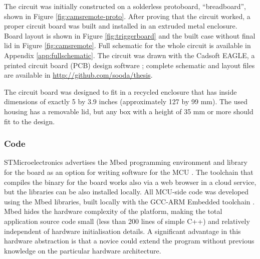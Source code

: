 The circuit was initially constructed on a solderless protoboard, ``breadboard'', shown in Figure \ref{fig:camsremote-proto}.
After proving that the circuit worked, a proper circuit board was built and installed in an extruded metal enclosure.
Board layout is shown in Figure \ref{fig:triggerboard} and the built case without final lid in Figure \ref{fig:camsremote}.
Full schematic for the whole circuit is available in Appendix \ref{app:fullschematic}.
The circuit was drawn with the Cadsoft EAGLE, a printed circuit board (PCB) design software \cite{eaglepcb}; complete schematic and layout files are available in \url {http://github.com/sooda/thesis}.

The circuit board was designed to fit in a recycled enclosure that has inside dimensions of exactly 5 by 3.9 inches (approximately 127 by 99 mm).
The used housing has a removable lid, but any box with a height of 35 mm or more should fit to the design.





\subsubsection{Code}

STMicroelectronics advertises the Mbed programming environment and library for the board as an option for writing software for the MCU \cite{mbednucleo}.
The toolchain that compiles the binary for the board works also via a web browser in a cloud service, but the libraries can be also installed locally.
All MCU-side code was developed using the Mbed libraries, built locally with the GCC-ARM Embedded toolchain \cite{launchpad-gcc-arm}.
Mbed hides the hardware complexity of the platform, making the total application source code small (less than 200 lines of simple C++) and relatively independent of hardware initialisation details.
A significant advantage in this hardware abstraction is that a novice could extend the program without previous knowledge on the particular hardware architecture.

